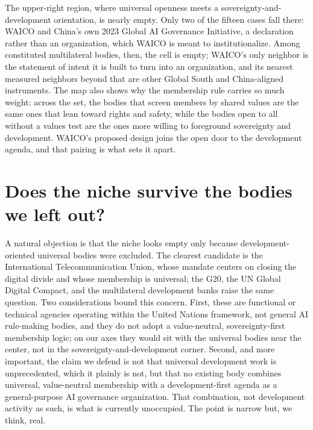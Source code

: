 \documentclass[11pt]{article}
\begin{document}
The upper-right region, where universal openness meets a sovereignty-and-development orientation, is nearly empty. Only two of the fifteen cases fall there: WAICO and China's own 2023 Global AI Governance Initiative, a declaration rather than an organization, which WAICO is meant to institutionalize. Among constituted multilateral bodies, then, the cell is empty; WAICO's only neighbor is the statement of intent it is built to turn into an organization, and its nearest measured neighbors beyond that are other Global South and China-aligned instruments. The map also shows why the membership rule carries so much weight: across the set, the bodies that screen members by shared values are the same ones that lean toward rights and safety, while the bodies open to all without a values test are the ones more willing to foreground sovereignty and development. WAICO's proposed design joins the open door to the development agenda, and that pairing is what sets it apart.

\section{Does the niche survive the bodies we left out?}
A natural objection is that the niche looks empty only because development-oriented universal bodies were excluded. The clearest candidate is the International Telecommunication Union, whose mandate centers on closing the digital divide and whose membership is universal; the G20, the UN Global Digital Compact, and the multilateral development banks raise the same question. Two considerations bound this concern. First, these are functional or technical agencies operating within the United Nations framework, not general AI rule-making bodies, and they do not adopt a value-neutral, sovereignty-first membership logic; on our axes they would sit with the universal bodies near the center, not in the sovereignty-and-development corner. Second, and more important, the claim we defend is not that universal development work is unprecedented, which it plainly is not, but that no existing body combines universal, value-neutral membership with a development-first agenda as a general-purpose AI governance organization. That combination, not development activity as such, is what is currently unoccupied. The point is narrow but, we think, real.

\end{document}
